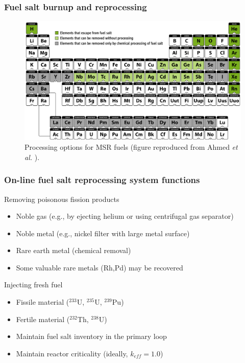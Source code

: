 \begin{frame}
\frametitle{Fuel salt burnup and reprocessing}
		\vspace{-5mm}
	\begin{figure}[t]
		\hspace*{-0.2in}
			\includegraphics[height=0.6\textwidth]{../figures/periodic_map.png}
		\vspace*{-0.05in}
		\caption{Processing options for MSR fuels (figure reproduced from Ahmed \emph{et al.}  \cite{ahmad_neutronics_2015}).}
	\end{figure}               
\end{frame}


\begin{frame}
\frametitle{On-line fuel salt reprocessing system functions}
\begin{block}{Removing poisonous fission products}
	\begin{itemize}
		\item Noble gas (e.g., by ejecting helium or using centrifugal gas separator)
		\item Noble metal (e.g., nickel filter with large metal surface)
        \item Rare earth metal (chemical removal)
		\item Some valuable rare metals (Rh,Pd) may be recovered %
	\end{itemize}
\end{block}

\begin{block}{Injecting fresh fuel}
	\begin{itemize}
		\item Fissile material ($^{233}$U, $^{235}$U, $^{239}$Pu)
		\item Fertile material ($^{232}$Th, $^{238}$U)
		\item Maintain fuel salt inventory in the primary loop
		\item Maintain reactor criticality (ideally, $k_{eff}=1.0$)
	\end{itemize}
\end{block}

\end{frame}


